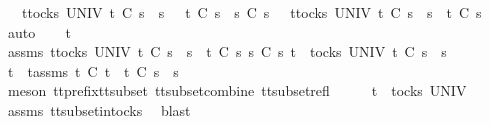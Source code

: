 \begin{isabellebody}
\ \ {\isachardoublequoteopen}{\isasymforall}\ t{\isasymin}tocks\ UNIV{\isachardot}\ t\ {\isasymle}\isactrlsub C\ s{}\ {\isacharat}\ s{}\ \ {\isasymlongrightarrow}\ t\ {\isasymle}\isactrlsub C\ s{}\ {\isasymLongrightarrow}\ s{}\ {\isasymsubseteq}\isactrlsub C\ s{}{\isacharprime}\ {\isasymLongrightarrow}\ {\isasymforall}\ t{\isasymin}tocks\ UNIV{\isachardot}\ t\ {\isasymle}\isactrlsub C\ s{}\ {\isacharat}\ s{}{\isacharprime}\ {\isasymlongrightarrow}\ t\ {\isasymle}\isactrlsub C\ s{}{\isachardoublequoteclose}\isanewline
%
\isadelimproof
%
\endisadelimproof
%
\isatagproof
{}\isamarkupfalse%
\ auto\isanewline
\ \ \isamarkupfalse%
\ t\isanewline
\ \ \isamarkupfalse%
\ assms{\isacharcolon}\ {\isachardoublequoteopen}{\isasymforall}t{\isasymin}tocks\ UNIV{\isachardot}\ t\ {\isasymle}\isactrlsub C\ s{}\ {\isacharat}\ s{}\ {\isasymlongrightarrow}\ t\ {\isasymle}\isactrlsub C\ s{}{\isachardoublequoteclose}\ {\isachardoublequoteopen}s{}\ {\isasymsubseteq}\isactrlsub C\ s{}{\isacharprime}{\isachardoublequoteclose}\ {\isachardoublequoteopen}t\ {\isasymin}\ tocks\ UNIV{\isachardoublequoteclose}\ {\isachardoublequoteopen}t\ {\isasymle}\isactrlsub C\ s{}\ {\isacharat}\ s{}{\isacharprime}{\isachardoublequoteclose}\isanewline
\ \ \isamarkupfalse%
\ \isamarkupfalse%
\ t{\isacharprime}\ \ t{\isacharprime}{\isacharunderscore}assms{\isacharcolon}\ {\isachardoublequoteopen}t{\isacharprime}\ {\isasymsubseteq}\isactrlsub C\ t\ {\isasymand}\ t{\isacharprime}\ {\isasymle}\isactrlsub C\ s{}\ {\isacharat}\ s{}{\isachardoublequoteclose}\isanewline
\ \ \ \ \isamarkupfalse%
\ {\isacharparenleft}meson\ tt{\isacharunderscore}prefix{\isacharunderscore}tt{\isacharunderscore}subset\ tt{\isacharunderscore}subset{\isacharunderscore}combine\ tt{\isacharunderscore}subset{\isacharunderscore}refl{\isacharparenright}\isanewline
\ \ \isamarkupfalse%
\ \isamarkupfalse%
\ {\isachardoublequoteopen}t{\isacharprime}\ {\isasymin}\ tocks\ UNIV{\isachardoublequoteclose}\isanewline
\ \ \ \ \isamarkupfalse%
\ assms{\isacharparenleft}{}{\isacharparenright}\ tt{\isacharunderscore}subset{\isacharunderscore}in{\isacharunderscore}tocks\ \isamarkupfalse%
\ blast\isanewline
\ \ \isamarkupfalse%
\ \isamarkupfalse%

\end{isabellebody}
